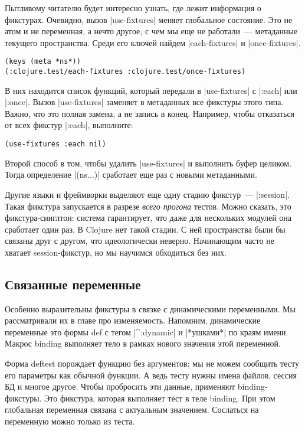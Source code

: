 Пытливому читателю будет интересно узнать, где лежит информация о
фикстурах. Очевидно, вызов \spverb|use-fixtures| меняет глобальное
состояние. Это не атом и не переменная, а нечто другое, с чем мы еще не
работали~--- метаданные текущего пространства. Среди его ключей найдем
\spverb|each-fixtures| и \spverb|once-fixtures|.

\begin{verbatim}
(keys (meta *ns*))
(:clojure.test/each-fixtures :clojure.test/once-fixtures)
\end{verbatim}

В них находится список функций, который передали в \spverb|use-fixtures| с
\spverb|:each| или \spverb|:once|. Вызов \spverb|use-fixtures| заменяет в
метаданных все фикстуры этого типа. Важно, что это полная замена, а не запись в
конец. Например, чтобы отказаться от всех фикстур \spverb|:each|, выполните:

\begin{verbatim}
(use-fixtures :each nil)
\end{verbatim}

Второй способ в том, чтобы удалить \spverb|use-fixtures| и выполнить буфер
целиком. Тогда определение \spverb|(ns...)| сработает еще раз с новыми
метаданными.

Другие языки и фреймворки выделяют еще одну стадию фикстур~---
\spverb|:session|. Такая фикстура запускается в разрезе \emph{всего прогона}
тестов. Можно сказать, это фикстура-синглтон: система гарантирует, что даже для
нескольких модулей она сработает один раз. В Clojure нет такой стадии. С ней
пространства были бы связаны друг с другом, что идеологически
неверно. Начинающим часто не хватает session-фикстур, но мы научимся обходиться
без них.


\subsection{Связанные переменные}

Особенно выразительны фикстуры в связке с динамическими переменными. Мы
рассматривали их в главе про изменяемость. Напомним, динамические переменные это
формы def с тегом \spverb|^:dynamic| и \spverb|*ушками*| по краям имени. Макрос
binding выполняет тело в рамках нового значения этой переменной.

Форма deftest порождает функцию без аргументов; мы не можем сообщить тесту его
параметры как обычной функции. А ведь тесту нужны имена файлов, сессия БД и
многое другое. Чтобы пробросить эти данные, применяют binding-фикстуры. Это
фикстура, которая выполняет тест в теле binding. При этом глобальная переменная
связана с актуальным значением. Сослаться на переменную можно только из теста.

